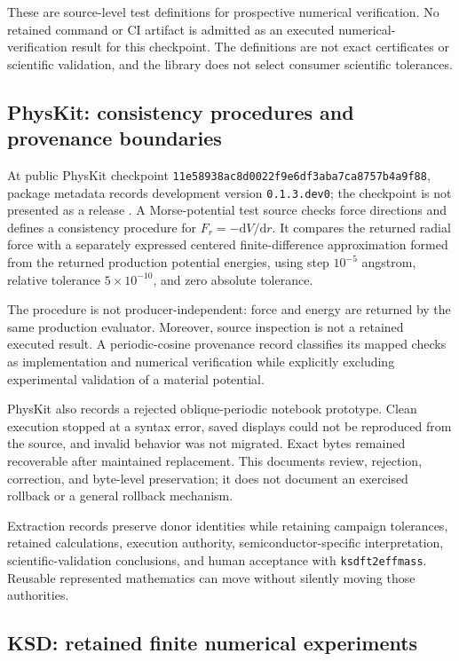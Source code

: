 \documentclass[11pt]{article}
\begin{document}
These are source-level test definitions for prospective numerical verification.
No retained command or CI artifact is admitted as an executed
numerical-verification result for this checkpoint. The definitions are not
exact certificates or scientific validation, and the library does not select
consumer scientific tolerances.

\subsection{PhysKit: consistency procedures and provenance boundaries}

At public PhysKit checkpoint
\texttt{11e58938ac8d0022f9e6df3aba7ca8757b4a9f88}, package metadata records
development version \texttt{0.1.3.dev0}; the checkpoint is not presented as a
release \citep{projectkoios_physkit_2026}. A Morse-potential test source checks
force directions and defines a consistency procedure for
$F_r=-\mathrm{d}V/\mathrm{d}r$. It compares the returned radial force with a
separately expressed centered finite-difference approximation formed from the
returned production potential energies, using step $10^{-5}$ angstrom,
relative tolerance $5\times10^{-10}$, and zero absolute tolerance.

The procedure is not producer-independent: force and energy are returned by the
same production evaluator. Moreover, source inspection is not a retained
executed result. A periodic-cosine provenance record classifies its mapped
checks as implementation and numerical verification while explicitly excluding
experimental validation of a material potential.

PhysKit also records a rejected oblique-periodic notebook prototype. Clean
execution stopped at a syntax error, saved displays could not be reproduced
from the source, and invalid behavior was not migrated. Exact bytes remained
recoverable after maintained replacement. This documents review, rejection,
correction, and byte-level preservation; it does not document an exercised
rollback or a general rollback mechanism.

Extraction records preserve donor identities while retaining campaign
tolerances, retained calculations, execution authority, semiconductor-specific
interpretation, scientific-validation conclusions, and human acceptance with
\texttt{ksdft2effmass}. Reusable represented mathematics can move without
silently moving those authorities.

\subsection{KSD: retained finite numerical experiments}
\end{document}
